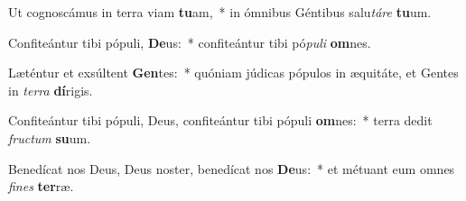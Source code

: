 \item Ut cognoscámus in terra viam \textbf{tu}am,~* in ómnibus Géntibus salu\textit{tá}\textit{re} \textbf{tu}um.
\item Confiteántur tibi pópuli, \textbf{De}us:~* confiteántur tibi pó\textit{pu}\textit{li} \textbf{om}nes.
\item Læténtur et exsúltent \textbf{Gen}tes:~* quóniam júdicas pópulos in æquitáte, et Gentes in \textit{ter}\textit{ra} \textbf{dí}rigis.
\item Confiteántur tibi pópuli, Deus, confiteántur tibi pópuli \textbf{om}nes:~* terra dedit \textit{fruc}\textit{tum} \textbf{su}um.
\item Benedícat nos Deus, Deus noster, benedícat nos \textbf{De}us:~* et métuant eum omnes \textit{fi}\textit{nes} \textbf{ter}ræ.

